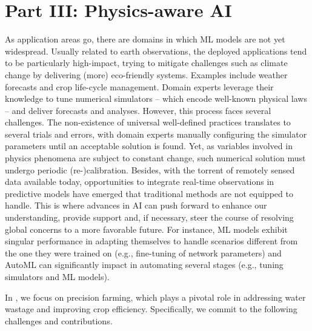 \section*{Part III: Physics-aware AI}

As application areas go, there are domains in which ML models are not yet widespread.
Usually related to earth observations, the deployed applications tend to be particularly high-impact, trying to mitigate challenges such as climate change by delivering (more) eco-friendly systems.
Examples include weather forecasts and crop life-cycle management.
Domain experts leverage their knowledge to tune numerical simulators -- which encode well-known physical laws -- and deliver forecasts and analyses.
However, this process faces several challenges.
The non-existence of universal well-defined practices translates to several trials and errors, with domain experts manually configuring the simulator parameters until an acceptable solution is found.
Yet, as variables involved in physics phenomena are subject to constant change, such numerical solution must undergo periodic (re-)calibration.
Besides, with the torrent of remotely sensed data available today, opportunities to integrate real-time observations in predictive models have emerged that traditional methods are not equipped to handle.
This is where advances in AI can push forward to enhance our understanding, provide support and, if necessary, steer the course of resolving global concerns to a more favorable future.
For instance, ML models exhibit singular performance in adapting themselves to handle scenarios different from the one they were trained on (e.g., fine-tuning of network parameters) and AutoML can significantly impact in automating several stages (e.g., tuning simulators and ML models).

In , we focus on precision farming, which plays a pivotal role in addressing water wastage and improving crop efficiency. Specifically, we commit to the following challenges and contributions.

